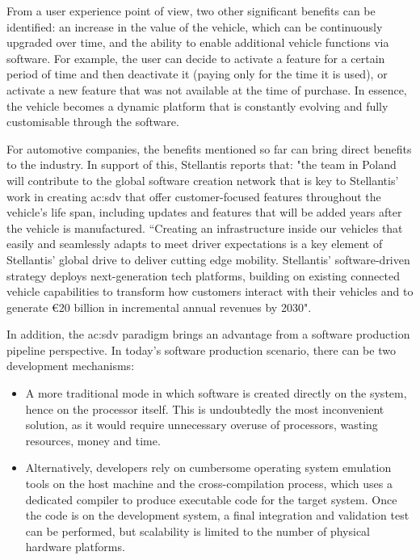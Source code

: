 From a user experience point of view, two other significant benefits can be identified: an increase in the value of the vehicle, which can be continuously upgraded over time, and the ability to enable additional vehicle functions via software. For example, the user can decide to activate a feature for a certain period of time and then deactivate it (paying only for the time it is used), or activate a new feature that was not available at the time of purchase. In essence, the vehicle becomes a dynamic platform that is constantly evolving and fully customisable through the software.

For automotive companies, the benefits mentioned so far can bring direct benefits to the industry. In support of this, Stellantis reports that: "the team in Poland will contribute to the global software creation network that is key to Stellantis' work in creating \gls{ac:sdv} that offer customer-focused features throughout the vehicle's life span, including updates and features that will be added years after the vehicle is manufactured. “Creating an infrastructure inside our vehicles that easily and seamlessly adapts to meet driver expectations is a key element of Stellantis' global drive to deliver cutting edge mobility. Stellantis' software-driven strategy deploys next-generation tech platforms, building on existing connected vehicle capabilities to transform how customers interact with their vehicles and to generate €20 billion in incremental annual revenues by 2030".

In addition, the \gls{ac:sdv} paradigm brings an advantage from a software production pipeline perspective. In today's software production scenario, there can be two development mechanisms:
\begin{itemize}
    \item A more traditional mode in which software is created directly on the system, hence on the processor itself. This is undoubtedly the most inconvenient solution, as it would require unnecessary overuse of processors, wasting resources, money and time.
    \item Alternatively, developers rely on cumbersome operating system emulation tools on the host machine and the cross-compilation process, which uses a dedicated compiler to produce executable code for the target system. Once the code is on the development system, a final integration and validation test can be performed, but scalability is limited to the number of physical hardware platforms. 
\end{itemize}

